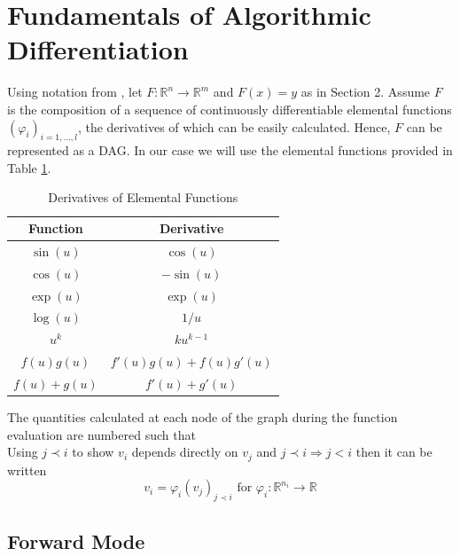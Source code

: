 \documentclass{article}
\begin{document}
\section{Fundamentals of Algorithmic Differentiation}

Using notation from \cite{evald}, let $F: \mathbb{R}^n \rightarrow \mathbb{R}^m$ and $F(x) = y$ as in Section 2. Assume $F$ is the composition of a sequence of continuously differentiable elemental functions $(\varphi_i)_{i=1,\ldots, l}$, the derivatives of which can be easily calculated. Hence, $F$ can be represented as a DAG. In our case we will use the elemental functions provided in Table \ref{tab:elemental}.

\begin{table}[h]
    \centering
    \begin{tabular}{|c|c|}
        \hline
        Function & Derivative \\
        \hline
        $\sin(u)$ & $\cos(u)$ \\
        $\cos(u)$ & $-\sin(u)$ \\
        $\exp(u) $ & $\exp(u)$ \\
        $\log(u)$ & $1/u$ \\
        $u^k$ & $k u^{k-1}$ \\
        $f(u)g(u)$ & $f'(u)g(u) + f(u)g'(u)$ \\
        $f(u) + g(u)$ & $f'(u) + g'(u)$ \\
        \hline
    \end{tabular}
    \caption{Derivatives of Elemental Functions}
    \label{tab:elemental}
\end{table}

The quantities calculated at each node of the graph during the function evaluation are numbered such that
\begin{equation*}
    [ \underbrace{v_{1-n}, \ldots, v_0}_{x} , v_1, \ldots, v_{l-m}, \underbrace{v_{l-m+1}, \ldots, v_l}_{y}]
\end{equation*}
Using $j \prec i$ to show $v_i$ depends directly on $v_j$ and $j \prec i \Longrightarrow j < i$ then it can be written
\begin{equation*}
    v_i = \varphi_i (v_j)_{j \prec i} \text{ for } \varphi_i : \mathbb{R}^{n_i} \longrightarrow \mathbb{R}
\end{equation*}

\subsection{Forward Mode}
\end{document}
